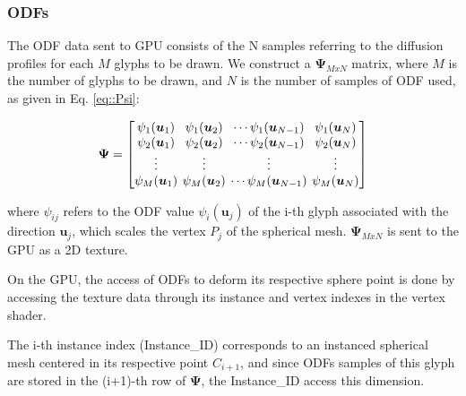 \documentclass[twoside,twocolumn,10pt]{article}
\begin{document}



\subsubsection{ODFs}

The ODF data sent to GPU consists of the N samples referring to the diffusion profiles for each $M$ glyphs to be drawn. We construct a $\bm{\Psi}_{MxN}$ matrix, where $M$ is the number of glyphs to be drawn, and $N$ is the number of samples of ODF used, as given in Eq. \ref{eq::Psi}:

\begin{equation}
\label{eq::Psi}
\bm{\Psi} = 
\begingroup %
\setlength\arraycolsep{2pt}
\begin{bmatrix} 
    \psi_1(\bm{u}_1) & \psi_1(\bm{u}_2) & \cdots \psi_1(\bm{u}_{N-1}) & \psi_1(\bm{u}_{N})  \\    
     \psi_2(\bm{u}_1)& \psi_2(\bm{u}_2) & \cdots \psi_2(\bm{u}_{N-1}) & \psi_2(\bm{u}_{N}) \\
    \vdots & \vdots & \vdots & \vdots  \\    
     \psi_M(\bm{u}_1)&\psi_M(\bm{u}_2) & \cdots \psi_M(\bm{u}_{N-1}) & \psi_M(\bm{u}_{N})
\end{bmatrix}
\endgroup
\end{equation}

where $\psi_{ij}$ refers to the ODF value $\psi_i(\bm{u}_j)$ of the i-th glyph associated with the direction $\bm{u}_j$, which scales the vertex $P_j$ of the spherical mesh. $\bm{\Psi}_{MxN}$ is sent to the GPU as a 2D texture.

On the GPU, the access of ODFs to deform its respective sphere point is done by accessing the texture data through its instance and vertex indexes in the vertex shader.

The i-th instance index (Instance\_ID) corresponds to an instanced spherical mesh centered in its respective point $C_{i+1}$, and since ODFs samples of this glyph are stored in the (i+1)-th row of $\bm{\Psi}$, the Instance\_ID access this dimension.
\end{document}

